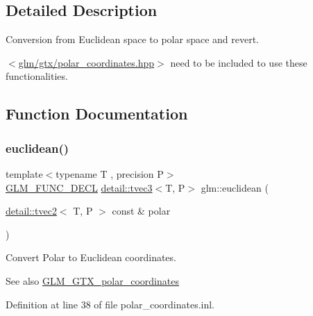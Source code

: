 \subsection{Detailed Description}
Conversion from Euclidean space to polar space and revert. 

$<$\hyperlink{polar__coordinates_8hpp}{glm/gtx/polar\+\_\+coordinates.\+hpp}$>$ need to be included to use these functionalities. 

\subsection{Function Documentation}
\mbox{\label{group__gtx__polar__coordinates_ga221eaf671619626425e9fb5cb69400b0}} 
\subsubsection{\texorpdfstring{euclidean()}{euclidean()}}
{\footnotesize\ttfamily template$<$typename T , precision P$>$ \\
\hyperlink{setup_8hpp_ab2d052de21a70539923e9bcbf6e83a51}{G\+L\+M\+\_\+\+F\+U\+N\+C\+\_\+\+D\+E\+CL} \hyperlink{structglm_1_1detail_1_1tvec3}{detail\+::tvec3}$<$T, P$>$ glm\+::euclidean (\begin{DoxyParamCaption}\item[{\hyperlink{structglm_1_1detail_1_1tvec2}{detail\+::tvec2}$<$ T, P $>$ const \&}]{polar }\end{DoxyParamCaption})}

Convert Polar to Euclidean coordinates.

\begin{DoxySeeAlso}{See also}
\hyperlink{group__gtx__polar__coordinates}{G\+L\+M\+\_\+\+G\+T\+X\+\_\+polar\+\_\+coordinates} 
\end{DoxySeeAlso}


Definition at line 38 of file polar\+\_\+coordinates.\+inl.

\mbox{\label{group__gtx__polar__coordinates_ga7d0a4068875efec56e5d2c6451b5bde2}} 
